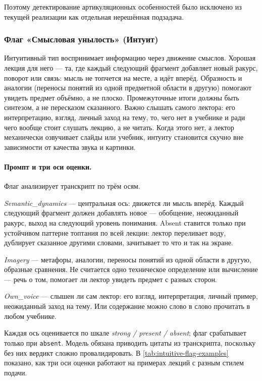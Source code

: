 Поэтому детектирование артикуляционных особенностей было исключено из текущей реализации
как отдельная нерешённая подзадача.

\subsubsection{Флаг «Смысловая унылость» (Интуит)}

Интуитивный тип воспринимает информацию через движение смыслов.
Хорошая лекция для него — та, где каждый следующий фрагмент добавляет
новый ракурс, поворот или связь: мысль не топчется на месте, а идёт вперёд.
Образность и аналогии (переносы понятий из одной предметной области
в другую) помогают увидеть предмет объёмно, а не плоско.
Промежуточные итоги должны быть синтезом, а не пересказом сказанного.
Важно слышать самого лектора: его интерпретацию, взгляд, личный заход на тему, 
то, чего нет в учебнике и ради чего вообще стоит слушать лекцию, а не читать.
Когда этого нет, а лектор механически озвучивает слайды или учебник, 
интуиту становится скучно вне зависимости от качества звука и картинки.

\paragraph{Промпт и три оси оценки.}

Флаг анализирует транскрипт по трём осям.

\textit{Semantic\_dynamics} — центральная ось: движется ли мысль вперёд.
Каждый следующий фрагмент должен добавлять новое — обобщение, неожиданный ракурс,
выход на следующий уровень понимания. Absent ставится только при устойчивом
паттерне топтания по всей лекции: лектор переливает воду,
дублирует сказанное другими словами, зачитывает то что и так на экране.

\textit{Imagery} — метафоры, аналогии, переносы понятий из одной области в другую,
образные сравнения. Не считается одно техническое определение или вычисление —
речь о том, помогает ли лектор увидеть предмет с разных сторон.

\textit{Own\_voice} — слышен ли сам лектор: его взгляд, интерпретация,
личный пример, неожиданный заход на тему.
Или содержание можно слово в слово прочитать в любом учебнике.

Каждая ось оценивается по шкале \textit{strong / present / absent};
флаг срабатывает только при \texttt{absent}.
Модель обязана приводить цитаты из транскрипта, поскольку без них вердикт сложно провалидировать.
В \cref{tab:intuitive-flag-examples} показано, как три оси оценки работают на примерах лекций с разным стилем подачи.


